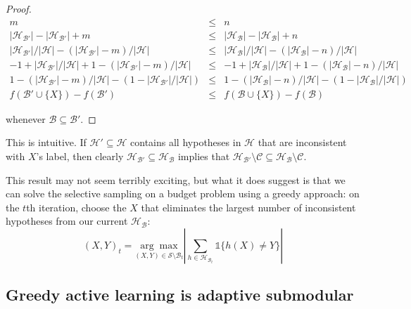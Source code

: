 \begin{proof}
\begin{eqnarray*}
m &\leq& n \\
|\mathcal{H}_{\mathcal{B}'}| - |\mathcal{H}_{\mathcal{B}'}| + m &\leq& |\mathcal{H}_{\mathcal{B}}| - |\mathcal{H}_{\mathcal{B}}| + n \\
|\mathcal{H}_{\mathcal{B}'}|/|\mathcal{H}| - (|\mathcal{H}_{\mathcal{B}'}| - m)/|\mathcal{H}| &\leq& |\mathcal{H}_{\mathcal{B}}|/|\mathcal{H}| - (|\mathcal{H}_{\mathcal{B}}| - n)/|\mathcal{H}| \\
-1 + |\mathcal{H}_{\mathcal{B}'}|/|\mathcal{H}| + 1 - (|\mathcal{H}_{\mathcal{B}'}| - m)/|\mathcal{H}| &\leq& -1 + |\mathcal{H}_{\mathcal{B}}|/|\mathcal{H}| + 1 - (|\mathcal{H}_{\mathcal{B}}| - n)/|\mathcal{H}| \\
1 - (|\mathcal{H}_{\mathcal{B}'}| - m)/|\mathcal{H}| - (1 - |\mathcal{H}_{\mathcal{B}'}|/|\mathcal{H}|) &\leq& 1 - (|\mathcal{H}_{\mathcal{B}}| - n)/|\mathcal{H}| - (1 - |\mathcal{H}_{\mathcal{B}}|/|\mathcal{H}|) \\
f(\mathcal{B}' \cup \{X\}) - f(\mathcal{B}') &\leq& f(\mathcal{B} \cup \{X\}) - f(\mathcal{B})
\end{eqnarray*}

\noindent whenever $\mathcal{B} \subseteq \mathcal{B}'$.
\end{proof}
\noindent This is intuitive. If $\mathcal{H}' \subseteq \mathcal{H}$ contains all hypotheses in $\mathcal{H}$ that are inconsistent with $X$'s label, then clearly $\mathcal{H}_{\mathcal{B}'} \subseteq \mathcal{H}_{\mathcal{B}}$ implies that $\mathcal{H}_{\mathcal{B}'} \setminus \mathcal{C} \subseteq \mathcal{H}_{\mathcal{B}} \setminus \mathcal{C}$.

This result may not seem terribly exciting, but what it does suggest is that we can solve the selective sampling on a budget problem using a greedy approach: on the $t$th iteration, choose the $X$ that eliminates the largest number of inconsistent hypotheses from our current $\mathcal{H}_{\mathcal{B}}$:
\[
(X, Y)_t = \underset{(X,Y) \in \mathcal{S} \setminus \mathcal{B}_t}{\arg\max} \left|\sum_{h \in \mathcal{H}_{\mathcal{B}_t}} \mathds{1}\{h(X) \not= Y\} \right|
\]

\subsection{Greedy active learning is adaptive submodular}

